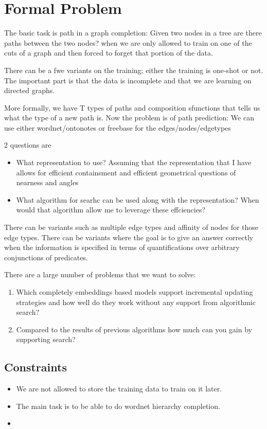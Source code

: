 \documentclass[11pt]{article}
\begin{document}
\section{Formal Problem}
\label{sec:formal-problem}
The basic task is path in a graph completion: Given two nodes in a
tree are there paths between the two nodes? when we are only allowed
to train on one of the cuts of a graph and then forced to forget that
portion of the data.

There can be a fwe variants on the training; either the training is
one-shot or not. The important part is that the data is incomplete and
that we are learning on directed graphs.

More formally, we have T types of paths and composition sfunctions
that tells us what the type of a new path is. Now the problem is of
path prediction: We can use either wordnet/ontonotes or freebase for
the edges/nodes/edgetypes

2 questions are
\begin{itemize}
\item What representation to use? Assuming that the representation
  that I have allows for efficient containsment and efficient
  geometrical questions of nearness and angles
\item What algorithm for searhc can be used along with the
  representation? When would that algorithm allow me to leverage these effciencies?
\end{itemize}

There can be variants such as multiple edge types and affinity of
nodes for those edge types. There can be variants where the goal is to
give an answer correctly when the information is specified in terms of
quantifications over arbitrary conjunctions of predicates.

There are a large number of problems that we want to solve:

\begin{enumerate}
\item Which completely embeddings based models support incremental
  updating strategies and how well do they work without any support
  from algorithmic search?
\item Compared to the results of previous algorithms how much can you
  gain by supporting search?
\end{enumerate}

\subsection{Constraints}
\label{sec:constraints}

\begin{itemize}
\item We are not allowed to store the training data to train on it later.
\item The main task is to be able to do wordnet hierarchy completion.
\item
\end{itemize}





\end{document}
